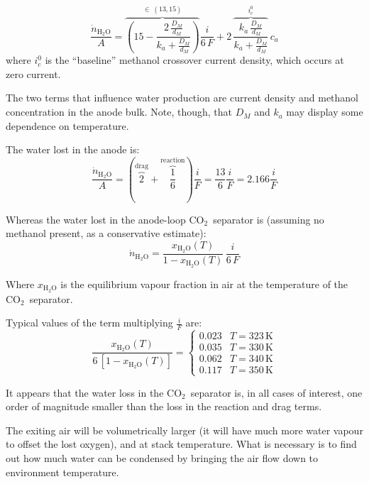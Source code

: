 \documentclass[a4paper,10pt]{article}
\newcommand{\HHO}{\ensuremath{\mathrm{H_2O}}}
\newcommand{\COO}{\ensuremath{\mathrm{CO_2}}}
\begin{document}
\begin{equation}
\boxed{
\frac{\dot n_\HHO}{A} = \overbrace{\left(15 - \frac{2\,\frac{D_M}{d_M}}{k_a+
\frac{D_M}{d_M}}\right)}^{\in~(13,15)} \frac{i}{6\,F} +
2\,\overbrace{\frac{k_a\,\frac{D_M}{d_M}}{k_a+\frac{D_M}{d_M}}}^{i_c^0} \, c_a
}
\end{equation}
where $i_c^0$ is the ``baseline'' methanol crossover current density, which
occurs at zero current.

The two terms that influence water production are current density and
methanol concentration in the anode bulk. Note, though, that $D_M$ and $k_a$ may
display some dependence on temperature.

The water lost in the anode is:
\begin{equation}
\frac{\dot n_\HHO}{A} = \left( \overbrace{2}^\text{drag} +
\overbrace{\frac{1}{6}}^\text{reaction} \right) \frac{i}{F}=
\frac{13}{6}\frac{i}{F} = 2.166 \frac{i}{F}
\end{equation}

Whereas the water lost in the anode-loop \COO\ separator is (assuming no
methanol present, as a conservative estimate):
\begin{equation}
\dot n_\HHO = \frac{x_\HHO(T)}{1-x_\HHO(T)}\,\frac{i}{6\,F}
\end{equation}

Where $x_\HHO$ is the equilibrium vapour fraction in air at the temperature
of the \COO\ separator.

Typical values of the term multiplying $\frac{i}{F}$ are:
\begin{equation}
\frac{x_\HHO(T)}{6\,[1-x_\HHO(T)]} =
\begin{cases}
0.023 & T = 323\,\mathrm{K}\\
0.035 & T = 330\,\mathrm{K}\\
0.062 & T = 340\,\mathrm{K}\\
0.117 & T = 350\,\mathrm{K}
\end{cases}
\end{equation}

It appears that the water loss in the \COO\ separator is, in all cases of
interest, one order of magnitude smaller than the loss in the reaction and
drag terms.

The exiting air will be volumetrically larger (it will have much more water
vapour to offset the lost oxygen), and at stack temperature. What is necessary
is to find out how much water can be condensed by bringing the air flow down to
environment temperature.
\end{document}

